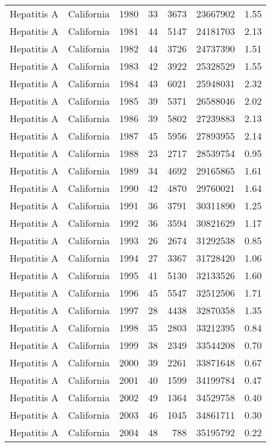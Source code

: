 \documentclass[
]{article}
\begin{document}
\begin{longtable}[]{@{}llrrrrr@{}}
Hepatitis A & California & 1980 & 33 & 3673 & 23667902 & 1.55 \\
Hepatitis A & California & 1981 & 44 & 5147 & 24181703 & 2.13 \\
Hepatitis A & California & 1982 & 44 & 3726 & 24737390 & 1.51 \\
Hepatitis A & California & 1983 & 42 & 3922 & 25328529 & 1.55 \\
Hepatitis A & California & 1984 & 43 & 6021 & 25948031 & 2.32 \\
Hepatitis A & California & 1985 & 39 & 5371 & 26588046 & 2.02 \\
Hepatitis A & California & 1986 & 39 & 5802 & 27239883 & 2.13 \\
Hepatitis A & California & 1987 & 45 & 5956 & 27893955 & 2.14 \\
Hepatitis A & California & 1988 & 23 & 2717 & 28539754 & 0.95 \\
Hepatitis A & California & 1989 & 34 & 4692 & 29165865 & 1.61 \\
Hepatitis A & California & 1990 & 42 & 4870 & 29760021 & 1.64 \\
Hepatitis A & California & 1991 & 36 & 3791 & 30311890 & 1.25 \\
Hepatitis A & California & 1992 & 36 & 3594 & 30821629 & 1.17 \\
Hepatitis A & California & 1993 & 26 & 2674 & 31292538 & 0.85 \\
Hepatitis A & California & 1994 & 27 & 3367 & 31728420 & 1.06 \\
Hepatitis A & California & 1995 & 41 & 5130 & 32133526 & 1.60 \\
Hepatitis A & California & 1996 & 45 & 5547 & 32512506 & 1.71 \\
Hepatitis A & California & 1997 & 28 & 4438 & 32870358 & 1.35 \\
Hepatitis A & California & 1998 & 35 & 2803 & 33212395 & 0.84 \\
Hepatitis A & California & 1999 & 38 & 2349 & 33544208 & 0.70 \\
Hepatitis A & California & 2000 & 39 & 2261 & 33871648 & 0.67 \\
Hepatitis A & California & 2001 & 40 & 1599 & 34199784 & 0.47 \\
Hepatitis A & California & 2002 & 49 & 1364 & 34529758 & 0.40 \\
Hepatitis A & California & 2003 & 46 & 1045 & 34861711 & 0.30 \\
Hepatitis A & California & 2004 & 48 & 788 & 35195792 & 0.22 \\

\end{longtable}
\end{document}
